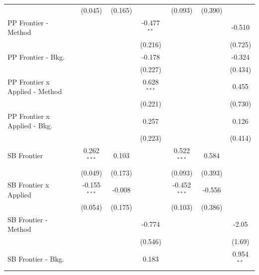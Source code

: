 \begin{tabular}{lcccccc}
                                  & (0.045)        & (0.165)        &               & (0.093)        & (0.390)        &   \\   
   PP Frontier - Method           &                &                & -0.477$^{**}$ &                &                & -0.510\\   
                                  &                &                & (0.216)       &                &                & (0.725)\\   
   PP Frontier - Bkg.             &                &                & -0.178        &                &                & -0.324\\   
                                  &                &                & (0.227)       &                &                & (0.434)\\   
   PP Frontier x Applied - Method &                &                & 0.628$^{***}$ &                &                & 0.455\\   
                                  &                &                & (0.221)       &                &                & (0.730)\\   
   PP Frontier x Applied - Bkg.   &                &                & 0.257         &                &                & 0.126\\   
                                  &                &                & (0.223)       &                &                & (0.414)\\   
   SB Frontier                    & 0.262$^{***}$  & 0.103          &               & 0.522$^{***}$  & 0.584          &   \\   
                                  & (0.049)        & (0.173)        &               & (0.093)        & (0.393)        &   \\   
   SB Frontier x Applied          & -0.155$^{***}$ & -0.008         &               & -0.452$^{***}$ & -0.556         &   \\   
                                  & (0.054)        & (0.175)        &               & (0.103)        & (0.386)        &   \\   
   SB Frontier - Method           &                &                & -0.774        &                &                & -2.05\\   
                                  &                &                & (0.546)       &                &                & (1.69)\\   
   SB Frontier - Bkg.             &                &                & 0.183         &                &                & 0.954$^{**}$\\   

\end{tabular}

